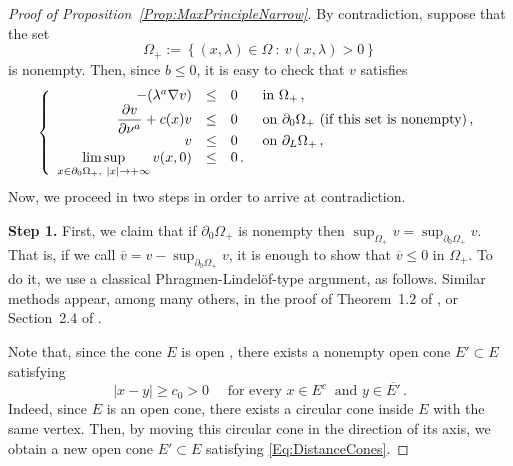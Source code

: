\documentclass[12pt,reqno]{amsart}
\theoremstyle{definition}
\theoremstyle{remark}
\newcommand\beqc[1]{\left\{\begin{array}{#1}}
\newcommand\eeqc{\end{array} \right.}
\def\PDEsystem{rcll}
\let\div\relax
\DeclareMathOperator{\div}{div}
\def\ds{\displaystyle}
\numberwithin{equation}{section}
\begin{document}
\begin{proof}[Proof of Proposition~\ref{Prop:MaxPrincipleNarrow}] 
By contradiction, suppose that the set 
$$
\Omega_+ := \left\{(x,\lambda) \in \Omega \ : \ v(x,\lambda)>0 \right\}
$$ 
is nonempty. Then, since $b\leq 0$, it is easy to check that $v$ satisfies
$$
\beqc{\PDEsystem}
-\div(\lambda^a \nabla v) &\leq& 0 & \text{ in } \Omega_+\,, \\
\dfrac{\partial v}{\partial \nu^a}  + c(x) v &\leq & 0 & \text{ on } \partial_0 \Omega_+ \text{ (if this set is nonempty)}\,, \\
v & \leq & 0 & \text{ on } \partial_L \Omega_+\,,\\
\ds \limsup_{x \in \partial_0\Omega_+,\ |x|\to +\infty} v(x,0) & \leq & 0\,.
\eeqc
$$
Now, we proceed in two steps in order to arrive at contradiction.

\textbf{Step 1.}
First, we claim that if $\partial_0 \Omega_+$ is nonempty then $\sup_{\Omega_+} v = \sup_{\partial_0 \Omega_+} v $. That is, if we call $\overline{v} = v - \sup_{\partial_0 \Omega_+} v$, it is enough to show that $\overline{v} \leq 0$ in $\Omega_+$. To do it, we use a classical Phragmen-Lindelöf-type argument, as follows. Similar methods appear, among many others, in the proof of Theorem~1.2 of \cite{BerestyckiCaffarelliNiremberg-Monotonicity}, or Section~2.4 of \cite{CabreSolaMorales}.

Note that, since the cone $E$ is open , there exists a nonempty open cone $E'\subset E$ satisfying
\begin{equation}
\label{Eq:DistanceCones}
|x-y| \geq c_0 > 0 \quad \text{ for every } x\in E^c \ \text{ and } y \in \overline{E'}\,.
\end{equation}
Indeed, since $E$ is an open cone, there exists a circular cone inside $E$ with the same vertex. Then, by moving this circular cone in the direction of its axis, we obtain a new open cone $E'\subset E$ satisfying \eqref{Eq:DistanceCones}.


\end{proof}
\end{document}

